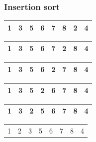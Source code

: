\begin{frame}
\frametitle{Insertion sort}
\begin{table}
\begin{tabular}{| c | c | c | c | c | c | c | c |}
\hline
\cellcolor{blue!25}1 & \cellcolor{blue!25}3 & \cellcolor{blue!25}5 & \cellcolor{blue!25}6 & \cellcolor{blue!25}7 & \cellcolor{blue!25}8 & \cellcolor{red!25}2 & 4 \\ 
\hline
\end{tabular}
\end{table}
\begin{table}
\begin{tabular}{| c | c | c | c | c | c | c | c |}
\hline
\cellcolor{blue!25}1 & \cellcolor{blue!25}3 & \cellcolor{blue!25}5 & \cellcolor{blue!25}6 & \cellcolor{blue!25}7 & \cellcolor{red!25}2 & \cellcolor{blue!25}8 & 4 \\ 
\hline
\end{tabular}
\end{table}
\begin{table}
\begin{tabular}{| c | c | c | c | c | c | c | c |}
\hline
\cellcolor{blue!25}1 & \cellcolor{blue!25}3 & \cellcolor{blue!25}5 & \cellcolor{blue!25}6 & \cellcolor{red!25}2 & \cellcolor{blue!25}7 & \cellcolor{blue!25}8 & 4 \\ 
\hline
\end{tabular}
\end{table}
\begin{table}
\begin{tabular}{| c | c | c | c | c | c | c | c |}
\hline
\cellcolor{blue!25}1 & \cellcolor{blue!25}3 & \cellcolor{blue!25}5 & \cellcolor{red!25}2 & \cellcolor{blue!25}6 & \cellcolor{blue!25}7 & \cellcolor{blue!25}8 & 4 \\ 
\hline
\end{tabular}
\end{table}
\begin{table}
\begin{tabular}{| c | c | c | c | c | c | c | c |}
\hline
\cellcolor{blue!25}1 & \cellcolor{blue!25}3 & \cellcolor{red!25}2 & \cellcolor{blue!25}5 & \cellcolor{blue!25}6 & \cellcolor{blue!25}7 & \cellcolor{blue!25}8 & 4 \\ 
\hline
\end{tabular}
\end{table}
\begin{table}
\begin{tabular}{| c | c | c | c | c | c | c | c |}
\hline
\cellcolor{blue!25}1 & \cellcolor{red!25}2 & \cellcolor{blue!25}3 & \cellcolor{blue!25}5 & \cellcolor{blue!25}6 & \cellcolor{blue!25}7 & \cellcolor{blue!25}8 & 4 \\ 

\end{tabular}
\end{table}
\end{frame}
